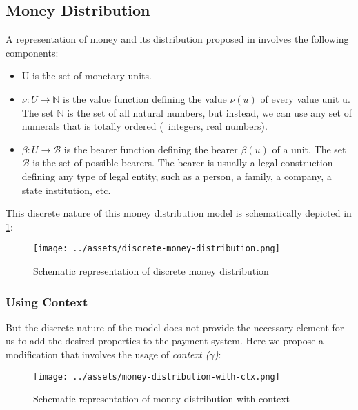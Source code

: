 \subsection{Money Distribution}

A representation of money and its distribution proposed in \cite{buldas2021unifying} involves the following components:

\begin{itemize}
\item U is the set of monetary units.
\item $\nu : U \rightarrow \mathbb{N}$ is the value function defining the value $\nu(u)$ of every value unit u. The set
    $\mathbb{N}$ is the set of all natural numbers, but instead, we can use any set of numerals that is totally ordered
    (\eg\ integers, real numbers).
\item $\beta : U \rightarrow \mathcal{B}$ is the bearer function defining the bearer $\beta(u)$ of a unit. The set
    $\mathcal{B}$ is the set of possible bearers. The bearer is usually a legal construction defining any type of legal
    entity, such as a person, a family, a company, a state institution, etc.
\end{itemize}

This discrete nature of this money distribution model is schematically depicted in \ref{fig:discrete-md}:

\begin{figure}[h]
    \centering
    \texttt{[image: ../assets/discrete-money-distribution.png]}
    \caption{Schematic representation of discrete money distribution}
    \label{fig:discrete-md}
\end{figure}

\subsubsection{Using Context}

But the discrete nature of the model does not provide the necessary element for us to add the desired properties to the
payment system. Here we propose a modification that involves the usage of \textit{context ($\gamma$)}:

\begin{figure}[h]
    \centering
    \texttt{[image: ../assets/money-distribution-with-ctx.png]}
    \caption{Schematic representation of money distribution with context}
    \label{fig:md-with-ctx}
\end{figure}


